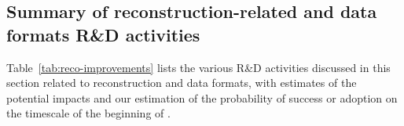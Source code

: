 \subsection{Summary of reconstruction-related and data formats R\&D activities} 

Table~\ref{tab:reco-improvements} lists the various R\&D activities discussed in this section related to reconstruction and data formats, with estimates of the potential impacts and our estimation of the probability of success or adoption on the timescale of the beginning of \RunFour. 


